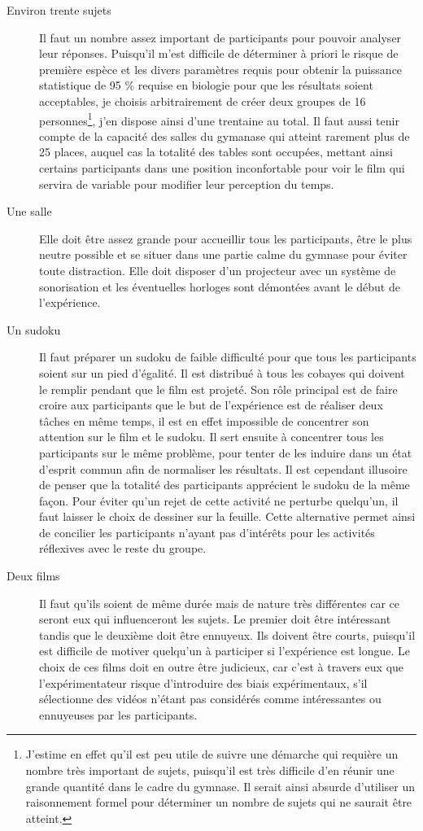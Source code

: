 \documentclass[12pt,fleqn,oneside,french,openany]{book} %
\begin{document}
\begin{description}
	\item[Environ trente sujets] Il faut un nombre assez important de participants pour pouvoir analyser leur réponses. Puisqu'il m'est difficile de déterminer à priori le risque de première espèce et les divers paramètres requis pour obtenir la puissance statistique de 95 \% requise en biologie pour que les résultats soient acceptables, je choisis arbitrairement de créer deux groupes de 16 personnes\footnote{J'estime en effet qu'il est peu utile de suivre une démarche qui requière un nombre très important de sujets, puisqu'il est très difficile d'en réunir une grande quantité dans le cadre du gymnase. Il serait ainsi absurde d'utiliser un raisonnement formel pour déterminer un nombre de sujets qui ne saurait être atteint.}, j'en dispose ainsi d'une trentaine au total. Il faut aussi tenir compte de la capacité des salles du gymanase qui atteint rarement plus de 25 places, auquel cas la totalité des tables sont occupées, mettant ainsi certains participants dans une position inconfortable pour voir le film qui servira de variable pour modifier leur perception du temps.
	\item[Une salle] Elle doit être assez grande pour accueillir tous les participants, être le plus neutre possible et se situer dans une partie calme du gymnase pour éviter toute distraction. Elle doit disposer d'un projecteur avec un système de sonorisation et les éventuelles horloges sont démontées avant le début de l'expérience.
	\item[Un sudoku] Il faut préparer un sudoku de faible difficulté pour que tous les participants soient sur un pied d'égalité. Il est distribué à tous les cobayes qui doivent le remplir pendant que le film est projeté. Son rôle principal est de faire croire aux participants que le but de l'expérience est de réaliser deux tâches en même temps, il est en effet impossible de concentrer son attention sur le film et le sudoku. Il sert ensuite à concentrer tous les participants sur le même problème, pour tenter de les induire dans un état d'esprit commun afin de normaliser les résultats. Il est cependant illusoire de penser que la totalité des participants apprécient le sudoku de la même façon. Pour éviter qu'un rejet de cette activité ne perturbe quelqu'un, il faut laisser le choix de dessiner sur la feuille. Cette alternative permet ainsi de concilier les participants n'ayant pas d'intérêts pour les activités réflexives avec le reste du groupe.
	\item[Deux films] Il faut qu'ils soient de même durée mais de nature très différentes car ce seront eux qui influenceront les sujets. Le premier doit être intéressant tandis que le deuxième doit être ennuyeux. Ils doivent être courts, puisqu'il est difficile de motiver quelqu'un à participer si l'expérience est longue. Le choix de ces films doit en outre être judicieux, car c'est à travers eux que l'expérimentateur risque d'introduire des biais expérimentaux, s'il sélectionne des vidéos n'étant pas considérés comme intéressantes ou ennuyeuses par les participants. 


\end{description}
\end{document}
